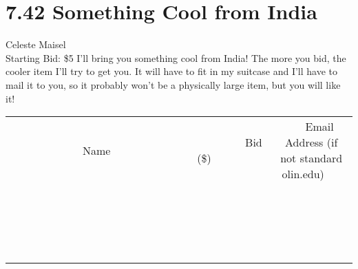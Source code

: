 \documentclass[11pt]{article}
\begin{document}
\section*{7.42 Something Cool from India}
Celeste Maisel
\\
Starting Bid: \$5
\newline
I'll bring you something cool from India!  The more you bid, the cooler item I'll try to get you.  It will have to fit in my suitcase and I'll have to mail it to you, so it probably won't be a physically large item, but you will like it!
\\[3ex]
\begin{tabular}{c c c}
~~~~~~~~~~~~~Name~~~~~~~~~~~~~ & ~~~~~~~~~Bid (\$)~~~~~~~~~  & ~~~Email Address (if not standard olin.edu)~~~\\
 & & \\
\hline
 & & \\
\hline
 & & \\
\hline
 & & \\
\hline
 & & \\
\hline
 & & \\
\hline
 & & \\
\hline
 & & \\
\hline
 & & \\
\hline
 & & \\
\hline
 & & \\
\hline
 & & \\
\hline
 & & \\
\hline
 & & \\
\hline
 & & \\
\hline
 & & \\
\hline
 & & \\
\hline
 & & \\
\hline
 & & \\
\hline
\end{tabular}
\newpage
\end{document}
